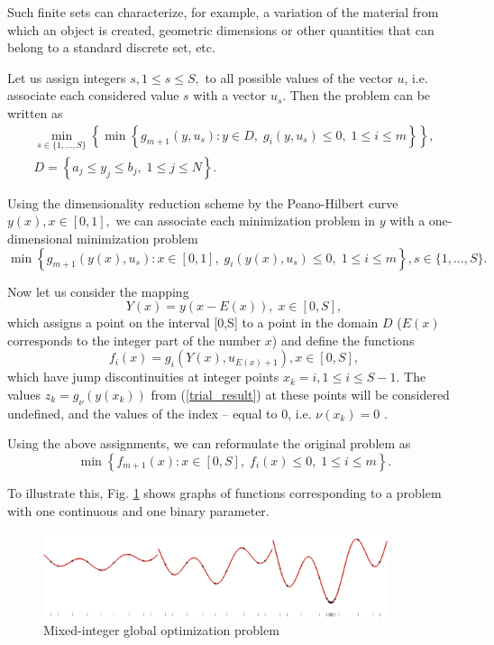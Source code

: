 \documentclass[
11pt,%
tightenlines,%
twoside,%
onecolumn,%
nofloats,%
nobibnotes,%
nofootinbib,%
superscriptaddress,%
noshowpacs,%
centertags]%
{revtex4}
\begin{document}
Such finite sets can characterize, for example, a variation of the material from which an object is created, geometric dimensions or other quantities that can belong to a standard discrete set, etc.


Let us assign integers  $s, 1\leq s \leq S,$ to all possible values of the vector $u$, i.e. associate each considered value $s$ with a vector $u_s$. 
Then the problem can be written as
\begin{gather}\label{problem_is}
 \min_{s\in\{1,...,S\}}\left\{\min{\left\{ g_{m+1}(y,u_s):y\in D, \; g_i(y,u_s)\leq 0, \; 1 \leq i \leq m\right\}}\right\},\\
 D=\left\{ a_j\leq y_j \leq b_j, \; 1 \leq j\leq N \right\}.\nonumber 
\end{gather}

Using the dimensionality reduction scheme by the Peano-Hilbert curve $y(x), x\in [0,1],$ we can associate each minimization problem in $y$ with a one-dimensional minimization problem
\[
 \min{\left\{ g_{m+1}(y(x),u_s):x \in [0,1], \; g_i(y(x),u_s)\leq 0, \; 1 \leq i \leq m\right\}}, s\in\{1,...,S\}.
\]

Now let us consider the mapping
\[
Y(x)=y(x-E(x)), \; x\in[0,S],
\]
which assigns a point on the interval  [0,S] to a point in the domain $D$ ($E(x)$ corresponds to the integer part of the number $x$) and define the functions 
\[
f_i(x) = g_i(Y(x),u_{E(x)+1}), x\in[0,S],
\]
which have jump discontinuities at integer points $x_k = i, 1\leq i \leq S-1$.
The values $z_k = g_\nu(y(x_k))$ from (\ref{trial_result}) at these points will be considered undefined, and the values of the index -- equal to 0, i.e. $\nu(x_k) = 0$ .

Using the above assignments, we can reformulate the original problem as
\begin{equation}\label{problem_is1}
\min \left\{f_{m+1}(x): x \in [0,S], \; f_i(x) \leq 0, \; 1 \leq i \leq m\right\}.
\end{equation}

To illustrate this, Fig. \ref{fig:1} shows graphs of functions corresponding to a problem with one continuous and one binary parameter.
\begin{figure}[ht]
    \centering
    \includegraphics[width=0.9\textwidth]{fig1.jpg}
    \caption{Mixed-integer global optimization problem}
    \label{fig:1}
\end{figure}
\end{document}
